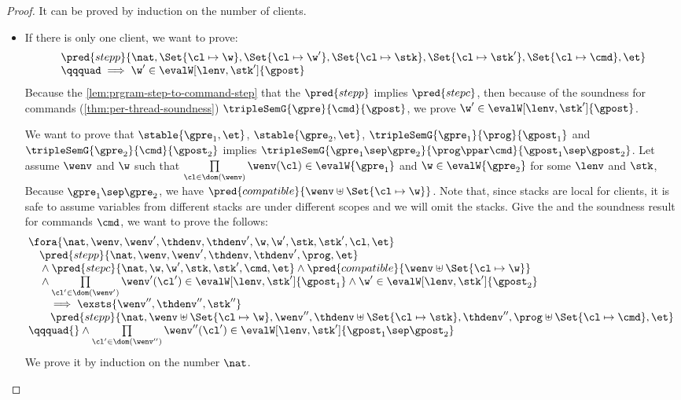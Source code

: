 \begin{proof}
It can be proved by induction on the number of clients.

\begin{itemize}
\item \caseB{\( \prog = \Set{\txid \mapsto \cmd} \)}
If there is only one client, we want to prove:
\[
    \begin{array}{l}
    \pred{stepp}{\nat, \Set{\cl \mapsto \w},\Set{\cl \mapsto \w'}, \Set{\cl \mapsto \stk}, \Set{ \cl \mapsto \stk'}, \Set{\cl \mapsto \cmd}, \et} \\
    \qqquad \implies \w' \in \evalW[\lenv, \stk']{\gpost}
\end{array}
\]
Because the \cref{lem:prgram-step-to-command-step} that the \( \pred{stepp} \) implies \( \pred{stepc}\), 
then because of the soundness for commands (\cref{thm:per-thread-soundness}) \( \tripleSemG{\gpre}{\cmd}{\gpost}\), we prove \( \w' \in \evalW[\lenv, \stk']{\gpost} \).

\caseI{\( \prog \ppar \cmd \)}
We want to prove that \( \stable{\gpre_1, \et} \), \( \stable{\gpre_2, \et} \), \( \tripleSemG{\gpre_{1}}{\prog}{ \gpost_{1} } \) and \( \tripleSemG{\gpre_{2}}{\cmd}{ \gpost_{2} } \) implies \( \tripleSemG{\gpre_{1} \sep \gpre_{2}}{\prog \ppar \cmd}{ \gpost_{1} \sep \gpost_{2} } \).
Let assume \( \wenv \) and \( \w \) such that \( \prod\limits_{\cl \in \dom(\wenv)} \wenv(\cl) \in \evalW{\gpre_{1}} \) and \( \w \in \evalW{\gpre_{2}}\) for some \( \lenv \) and \( \stk \),
Because \( \gpre_{1} \sep \gpre_{2} \), we have \( \pred{compatible}{\wenv \uplus \Set{\cl \mapsto \w}}\).
Note that, since stacks are local for clients, it is safe to assume variables from different stacks are under different scopes and we will omit the stacks.
Give the \ih and the soundness result for commands \( \cmd \), we want to prove the follows:
\[
\begin{array}{@{}l}
    \fora{\nat, \wenv, \wenv', \thdenv, \thdenv', \w, \w', \stk, \stk', \cl, \et}  \\
    \quad \pred{stepp}{\nat, \wenv, \wenv', \thdenv, \thdenv', \prog, \et}  \\
    \quad {} \land \pred{stepc}{\nat, \w, \w', \stk, \stk', \cmd, \et} 
    \land \pred{compatible}{\wenv \uplus \Set{\cl \mapsto \w}} \\
    \quad {} \land \prod\limits_{\cl' \in \dom(\wenv') } \wenv'(\cl')  \in \evalW[\lenv, \stk']{\gpost_{1}} \land \w' \in \evalW[\lenv, \stk']{\gpost_{2}} \\
    \qquad \implies \exsts{\wenv'', \thdenv'', \stk'' }  \\
    \qquad \pred{stepp}{\nat, \wenv \uplus \Set{\cl \mapsto \w}, \wenv'', \thdenv \uplus \Set{\cl \mapsto \stk}, \thdenv'', \prog \uplus \Set{\cl \mapsto \cmd}, \et}  \\
    \qqquad {} \land \prod\limits_{\cl' \in \dom(\wenv'') } \wenv''(\cl')  \in \evalW[\lenv, \stk']{\gpost_{1} \sep \gpost_{2}}
\end{array}
\]
We prove it by induction on the number \( \nat \).
\begin{itemize}


\end{itemize}
\end{itemize}
\end{proof}
